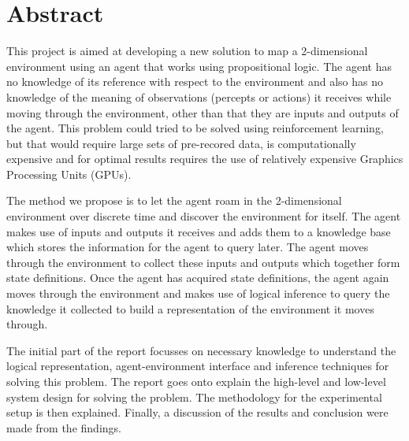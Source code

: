 \chapter{Abstract}

%
%

This project is aimed at developing a new solution to map a 2-dimensional environment using an agent that works using propositional logic. The agent has no knowledge of its reference with respect to the environment and also has no knowledge of the meaning of observations (percepts or actions) it receives while moving through the environment, other than that they are inputs and outputs of the agent. This problem could tried to be solved using reinforcement learning, but that would require large sets of pre-recored data, is computationally expensive and for optimal results requires the use of relatively expensive Graphics Processing Units (GPUs).

The method we propose is to let the agent roam in the 2-dimensional environment over discrete time and discover the environment for itself.
The agent makes use of inputs and outputs it receives and adds them to a knowledge base which stores the information for the agent to query later. The agent moves through the environment to collect these inputs and outputs which together form state definitions. Once the agent has acquired state definitions, the agent again moves through the environment and makes use of logical inference to query the knowledge it collected to build a representation of the environment it moves through.

The initial part of the report focusses on necessary knowledge to understand the logical representation, agent-environment interface and inference techniques for solving this problem. The report goes onto explain the high-level and low-level system design for solving the problem. The methodology for the experimental setup is then explained. Finally, a discussion of the results and conclusion were made from the findings.

